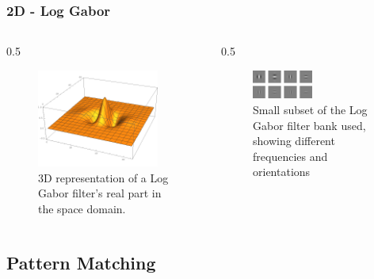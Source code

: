 \documentclass{beamer}
\begin{document}
\begin{frame}
	[fragile] \frametitle{2D - Log Gabor}
	
	\begin{columns}
		\begin{column}
			{0.5
			\textwidth} 
			\begin{figure}[H]
			\centering
			  \includegraphics[width=0.89\textwidth]{../report/iris/log_gabor_2d.png}
				\caption{3D representation of a Log Gabor filter's real part in the space domain.}
				\label{fig:2Dloggabor}
			\end{figure}
		\end{column}
		\begin{column}
			{0.5
			\textwidth} 
			\begin{figure}[t]
				\centering
			  \includegraphics[width=0.49\textwidth]{../report/iris/2d_log_gabor_filter.png}
				\caption{Small subset of the Log Gabor filter bank used, showing different frequencies and orientations}
				\label{fig:filter_bank}
			\end{figure}
		\end{column}
	\end{columns}
	
\end{frame}

\subsection{Pattern Matching} 
\end{document}
